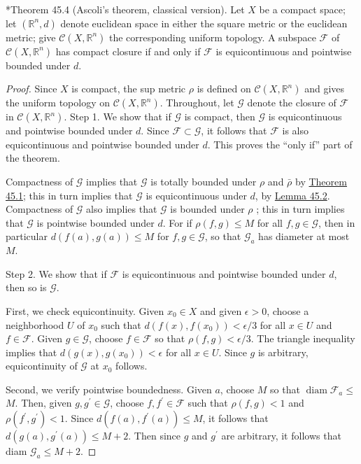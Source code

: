 *Theorem 45.4 (Ascoli's theorem, classical version). Let \(X\) be a compact space; let \(({\mathbb{R}^{n},d})\) denote euclidean space in either the square metric or the euclidean metric; give \(\mathcal{C}({X,\mathbb{R}^{n}})\) the corresponding uniform topology. A subspace \(\mathcal{F}\) of \(\mathcal{C}({X,\mathbb{R}^{n}})\) has compact closure if and only if \(\mathcal{F}\) is equicontinuous and pointwise bounded under \(d\).

\begin{proof}
Since \(X\) is compact, the sup metric \(\rho\) is defined on \(\mathcal{C}({X,\mathbb{R}^{n}})\) and gives the uniform topology on \(\mathcal{C}({X,\mathbb{R}^{n}})\). Throughout, let \(\mathcal{G}\) denote the closure of \(\mathcal{F}\) in \(\mathcal{C}({X,\mathbb{R}^{n}})\).
Step 1. We show that if \(\mathcal{G}\) is compact, then \(\mathcal{G}\) is equicontinuous and pointwise bounded under \(d\). Since \(\mathcal{F} \subset \mathcal{G}\), it follows that \(\mathcal{F}\) is also equicontinuous and pointwise bounded under \(d\). This proves the ``only if'' part of the theorem.

Compactness of \(\mathcal{G}\) implies that \(\mathcal{G}\) is totally bounded under \(\rho\) and \(\bar{\rho }\) by \hyperref[thm:45.1]{Theorem 45.1}; this in turn implies that \(\mathcal{G}\) is equicontinuous under \(d\), by \hyperref[lem:45.2]{Lemma 45.2}. Compactness of \(\mathcal{G}\) also implies that \(\mathcal{G}\) is bounded under \(\rho\) ; this in turn implies that \(\mathcal{G}\) is pointwise bounded under \(d\). For if \(\rho ({f,g}) \leq M\) for all \(f,g \in \mathcal{G}\), then in particular \(d({f( a),g( a) }) \leq M\) for \(f,g \in \mathcal{G}\), so that \(\mathcal{G}_{a}\) has diameter at most \(M\).

Step 2. We show that if \(\mathcal{F}\) is equicontinuous and pointwise bounded under \(d\), then so is \(\mathcal{G}\).

First, we check equicontinuity. Given \(x_{0} \in X\) and given \(\epsilon > 0\), choose a neighborhood \(U\) of \(x_{0}\) such that \(d({f(x),f(x_{0}) }) < \epsilon /3\) for all \(x \in U\) and \(f \in \mathcal{F}\). Given \(g \in \mathcal{G}\), choose \(f \in \mathcal{F}\) so that \(\rho ({f,g}) < \epsilon /3\). The triangle inequality implies that \(d({g(x),g(x_{0}) }) < \epsilon\) for all \(x \in U\). Since \(g\) is arbitrary, equicontinuity of \(\mathcal{G}\) at \(x_{0}\) follows.

Second, we verify pointwise boundedness. Given \(a\), choose \(M\) so that \(\operatorname{diam}\mathcal{F}_{a} \leq\) \(M\). Then, given \(g,g^{\prime } \in \mathcal{G}\), choose \(f,f^{\prime } \in \mathcal{F}\) such that \(\rho ({f,g}) < 1\) and \(\rho ({f^{\prime },g^{\prime }}) < 1\). Since \(d({f( a),f^{\prime }( a) }) \leq M\), it follows that \(d({g( a),g^{\prime }( a) }) \leq M + 2\). Then since \(g\) and \(g^{\prime }\) are arbitrary, it follows that diam \(\mathcal{G}_{a} \leq M + 2\).


\end{proof}
